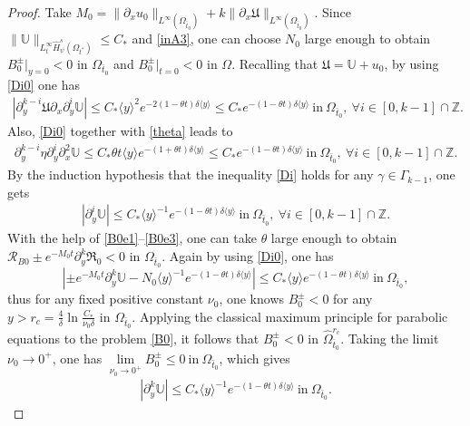 \documentclass{amsart}
\numberwithin{equation}{section}
\newcommand\y{{{\langle y \rangle}}}
\begin{document}
\begin{proof}
Take $M_{0}=\|\partial_{x}u_{0}\|_{L^{\infty}(\Omega_{\bar{t}_{0}})}+k\|\partial_{x}\mathfrak{U}\|_{L^{\infty}(\Omega_{\bar{t}_{0}})}$.
Since $\|\mathbb{U}\|_{L_{t}^{\infty}\hat{H}_{\psi}^{s}(\Omega_{t^{*}})}\leq C_{*}$ and \eqref{inA3}, one can choose $N_{0}$ large enough to obtain $B_{0}^{\pm}|_{y=0}<0$ in $\Omega_{\bar{t}_{0}}$ and $B_{0}^{\pm}|_{t=0}<0$ in $\Omega$. Recalling that $\mathfrak{U}=\mathbb{U}+u_{0}$, by using \eqref{Di0} one has
\begin{align}\label{B0e1}
|\partial_{y}^{k-i}\mathfrak{U}\partial_{x}\partial_{y}^{i}\mathbb{U}|
\leq C_{*}\y^{2}e^{-2(1-\theta t)\delta\y}
\leq C_{*}e^{-(1-\theta t)\delta\y}~\text{in}~\Omega_{\bar{t}_{0}},~\forall i\in[0,k-1]\cap\mathbb{Z}.
\end{align}
Also, \eqref{Di0} together with \eqref{theta} leads to
\begin{align}\label{B0e2}
\partial_{y}^{k-i}\eta \partial_{y}^{i}\partial_{x}^{2}\mathbb{U}
\leq C_{*}\theta t\y e^{-(1+\theta t)\delta\y}
\leq C_{*}e^{-(1-\theta t)\delta\y}~\text{in}~\Omega_{\bar{t}_{0}}, ~\forall i\in[0,k-1]\cap\mathbb{Z}.
\end{align}
By the induction hypothesis that the inequality \eqref{Di} holds for any $\gamma\in\Gamma_{k-1}$, one gets
\begin{align}\label{B0e3}
|\partial_{y}^{i}\mathbb{U}|\leq C_{*}\y^{-1}e^{-(1-\theta t)\delta\y}~\text{in}~\Omega_{\bar{t}_{0}},~\forall i\in[0,k-1]\cap\mathbb{Z}.
\end{align}
With the help of \eqref{B0e1}--\eqref{B0e3}, one can take $\theta$ large enough to obtain
 $\mathcal{R}_{B0}\pm e^{-M_{0}t}\partial_{y}^{k}\mathfrak{R}_{0}<0$ in $\Omega_{\bar{t}_{0}}$.
Again by using \eqref{Di0}, one has
$$|\pm e^{-M_{0}t}\partial_{y}^{k}\mathbb{U}-N_{0}\y^{-1}e^{-(1-\theta t)\delta\y}|
\leq C_{*}\y e^{-(1-\theta t)\delta\y}~\text{in}~\Omega_{\bar{t}_{0}},$$
thus for any fixed positive constant $\nu_{0}$, one knows $B_{0}^{\pm}<0$ for any $y>r_{c}=\frac{4}{\delta}\ln{\frac{C_{*}}{\nu_{0}\delta}}$ in $\Omega_{\bar{t}_{0}}$.
Applying the classical maximum principle for parabolic equations to the problem \eqref{B0}, it follows that
$B_{0}^{\pm}<0$ in $\hat{\Omega}_{\bar{t}_{0}}^{r_{c}}$.
Taking the limit $\nu_{0}\to 0^{+}$, one has $\lim\limits_{\nu_{0}\to 0^{+}}B_{0}^{\pm}\leq0 ~\text{in}~\Omega_{\bar{t}_{0}}$, which gives
\begin{align*}
|\partial_{y}^{k}\mathbb{U}|\leq C_{*}\y^{-1}e^{-(1-\theta t)\delta\y} ~\text{in}~\Omega_{\bar{t}_{0}}.
\end{align*}


\end{proof}
\end{document}
